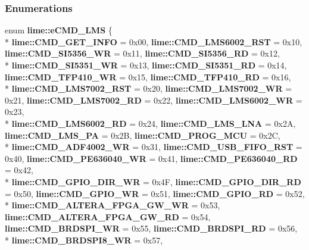 \subsubsection*{Enumerations}
\begin{DoxyCompactItemize}
\item 
enum {\bf lime\+::e\+C\+M\+D\+\_\+\+L\+MS} \{ \\*
{\bf lime\+::\+C\+M\+D\+\_\+\+G\+E\+T\+\_\+\+I\+N\+FO} = 0x00, 
{\bf lime\+::\+C\+M\+D\+\_\+\+L\+M\+S6002\+\_\+\+R\+ST} = 0x10, 
{\bf lime\+::\+C\+M\+D\+\_\+\+S\+I5356\+\_\+\+WR} = 0x11, 
{\bf lime\+::\+C\+M\+D\+\_\+\+S\+I5356\+\_\+\+RD} = 0x12, 
\\*
{\bf lime\+::\+C\+M\+D\+\_\+\+S\+I5351\+\_\+\+WR} = 0x13, 
{\bf lime\+::\+C\+M\+D\+\_\+\+S\+I5351\+\_\+\+RD} = 0x14, 
{\bf lime\+::\+C\+M\+D\+\_\+\+T\+F\+P410\+\_\+\+WR} = 0x15, 
{\bf lime\+::\+C\+M\+D\+\_\+\+T\+F\+P410\+\_\+\+RD} = 0x16, 
\\*
{\bf lime\+::\+C\+M\+D\+\_\+\+L\+M\+S7002\+\_\+\+R\+ST} = 0x20, 
{\bf lime\+::\+C\+M\+D\+\_\+\+L\+M\+S7002\+\_\+\+WR} = 0x21, 
{\bf lime\+::\+C\+M\+D\+\_\+\+L\+M\+S7002\+\_\+\+RD} = 0x22, 
{\bf lime\+::\+C\+M\+D\+\_\+\+L\+M\+S6002\+\_\+\+WR} = 0x23, 
\\*
{\bf lime\+::\+C\+M\+D\+\_\+\+L\+M\+S6002\+\_\+\+RD} = 0x24, 
{\bf lime\+::\+C\+M\+D\+\_\+\+L\+M\+S\+\_\+\+L\+NA} = 0x2A, 
{\bf lime\+::\+C\+M\+D\+\_\+\+L\+M\+S\+\_\+\+PA} = 0x2B, 
{\bf lime\+::\+C\+M\+D\+\_\+\+P\+R\+O\+G\+\_\+\+M\+CU} = 0x2C, 
\\*
{\bf lime\+::\+C\+M\+D\+\_\+\+A\+D\+F4002\+\_\+\+WR} = 0x31, 
{\bf lime\+::\+C\+M\+D\+\_\+\+U\+S\+B\+\_\+\+F\+I\+F\+O\+\_\+\+R\+ST} = 0x40, 
{\bf lime\+::\+C\+M\+D\+\_\+\+P\+E636040\+\_\+\+WR} = 0x41, 
{\bf lime\+::\+C\+M\+D\+\_\+\+P\+E636040\+\_\+\+RD} = 0x42, 
\\*
{\bf lime\+::\+C\+M\+D\+\_\+\+G\+P\+I\+O\+\_\+\+D\+I\+R\+\_\+\+WR} = 0x4F, 
{\bf lime\+::\+C\+M\+D\+\_\+\+G\+P\+I\+O\+\_\+\+D\+I\+R\+\_\+\+RD} = 0x50, 
{\bf lime\+::\+C\+M\+D\+\_\+\+G\+P\+I\+O\+\_\+\+WR} = 0x51, 
{\bf lime\+::\+C\+M\+D\+\_\+\+G\+P\+I\+O\+\_\+\+RD} = 0x52, 
\\*
{\bf lime\+::\+C\+M\+D\+\_\+\+A\+L\+T\+E\+R\+A\+\_\+\+F\+P\+G\+A\+\_\+\+G\+W\+\_\+\+WR} = 0x53, 
{\bf lime\+::\+C\+M\+D\+\_\+\+A\+L\+T\+E\+R\+A\+\_\+\+F\+P\+G\+A\+\_\+\+G\+W\+\_\+\+RD} = 0x54, 
{\bf lime\+::\+C\+M\+D\+\_\+\+B\+R\+D\+S\+P\+I\+\_\+\+WR} = 0x55, 
{\bf lime\+::\+C\+M\+D\+\_\+\+B\+R\+D\+S\+P\+I\+\_\+\+RD} = 0x56, 
\\*
{\bf lime\+::\+C\+M\+D\+\_\+\+B\+R\+D\+S\+P\+I8\+\_\+\+WR} = 0x57, 

\end{DoxyCompactItemize}

